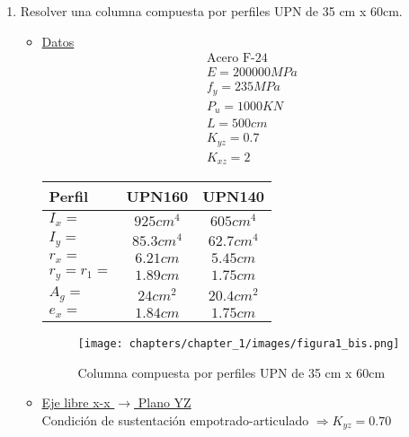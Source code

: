 \begin{enumerate}
\item Resolver una columna compuesta por perfiles UPN de 35 cm x 60cm.
\begin{itemize}
\item \underline{Datos}
\begin{align*}
& \text{Acero F-24}\\
& E = 200000MPa\\
& f_y = 235MPa\\
& P_u = 1000KN\\
& L = 500cm\\
& K_{yz} = 0.7\\
& K_{xz} = 2
\end{align*}
\begin{table}[H]
  \begin{center}
    \begin{tabular}{l|c|c} %
      Perfil & UPN160 & UPN140\\
      \hline
      $I_x =$ & $925cm^4$ & $605cm^4$\\
      $I_y =$ & $85.3cm^4$ & $62.7cm^4$\\
      $r_x =$ & $6.21cm$ & $5.45cm$\\
      $r_y = r_1 =$ & $1.89cm$ & $1.75cm$\\
      $A_g =$ & $24cm^2$ & $20.4cm^2$\\
      $e_x =$ & $1.84cm$ & $1.75cm$\\
    \end{tabular}
  \end{center}
\end{table}

\begin{figure}[H]
\begin{center}
     \texttt{[image: chapters/chapter\_1/images/figura1\_bis.png]}
\end{center}
\caption{Columna compuesta por perfiles UPN de 35 cm x 60cm}
\end{figure}

\newpage
\item \underline{Eje libre x-x $\rightarrow$ Plano YZ}\\
Condición de sustentación empotrado-articulado $\Rightarrow K_{yz} = 0.70$


\end{itemize}
\end{enumerate}
